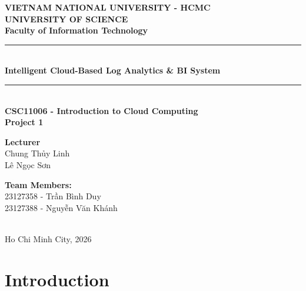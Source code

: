 \documentclass[12pt,a4paper]{article}
\begin{document}
\begin{titlepage}
    \centering
    \vspace*{1cm}
    
    \textbf{\Large VIETNAM NATIONAL UNIVERSITY - HCMC}\\[0.3cm]
    \textbf{\Large UNIVERSITY OF SCIENCE}\\[0.3cm]
    \textbf{\large Faculty of Information Technology}\\[2cm]
    
    \rule{\linewidth}{0.5mm}\\[0.5cm]
    {\huge \bfseries Intelligent Cloud-Based Log Analytics \& BI System}\\[0.3cm]
    \rule{\linewidth}{0.5mm}\\[1.5cm]
    
    \textbf{\Large CSC11006 - Introduction to Cloud Computing}\\[0.5cm]
    \textbf{\Large Project 1}\\[2cm]
    
    \begin{minipage}{0.5\textwidth}
        \begin{flushleft}
            \textbf{Lecturer}\\
            \foreignlanguage{vietnamese}{Chung Thủy Linh} \\
            \foreignlanguage{vietnamese}{Lê Ngọc Sơn}
        \end{flushleft}
    \end{minipage}
    \begin{minipage}{0.4\textwidth}
        \begin{flushleft}
            \textbf{Team Members:}\\
            23127358 - \foreignlanguage{vietnamese}{Trần Bình Duy}\\
            23127388 - \foreignlanguage{vietnamese}{Nguyễn Văn Khánh}
        \end{flushleft}
    \end{minipage}\\[3cm]
    
    \vfill
    {\large Ho Chi Minh City, 2026}
\end{titlepage}

\tableofcontents
\newpage

\section{Introduction}
\end{document}
